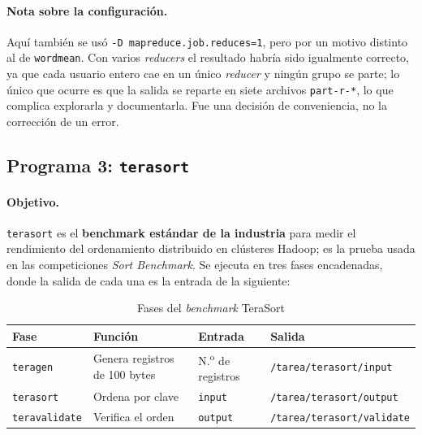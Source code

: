 \paragraph{Nota sobre la configuración.} Aquí también se usó \texttt{-\bk{}D mapreduce.\bk{}job.\bk{}reduces=\bk{}1}, pero por un motivo distinto al de \texttt{wordmean}. Con varios \textit{reducers} el resultado habría sido igualmente correcto, ya que cada usuario entero cae en un único \textit{reducer} y ningún grupo se parte; lo único que ocurre es que la salida se reparte en siete archivos \texttt{part-r-*}, lo que complica explorarla y documentarla. Fue una decisión de conveniencia, no la corrección de un error.

\subsection{Programa 3: \texttt{terasort}}

\paragraph{Objetivo.} \texttt{terasort} es el \textbf{benchmark estándar de la industria} para medir el rendimiento del ordenamiento distribuido en clústeres Hadoop; es la prueba usada en las competiciones \textit{Sort Benchmark}. Se ejecuta en tres fases encadenadas, donde la salida de cada una es la entrada de la siguiente:

\begin{table}[H]
\centering
\caption{Fases del \textit{benchmark} TeraSort}
\label{tab:terasort-fases}
\vspace{0.2cm}
\small
\begin{tabular}{@{}lp{4.1cm}ll@{}}
\toprule
\textbf{Fase} & \textbf{Función} & \textbf{Entrada} & \textbf{Salida} \\
\midrule
\texttt{teragen}      & Genera registros de 100 bytes & N.\textsuperscript{o} de registros & \texttt{/\bk{}tarea/\bk{}terasort/\bk{}input} \\
\texttt{terasort}     & Ordena por clave              & \texttt{input}  & \texttt{/\bk{}tarea/\bk{}terasort/\bk{}output} \\
\texttt{teravalidate} & Verifica el orden             & \texttt{output} & \texttt{/\bk{}tarea/\bk{}terasort/\bk{}validate} \\
\bottomrule
\end{tabular}
\end{table}

